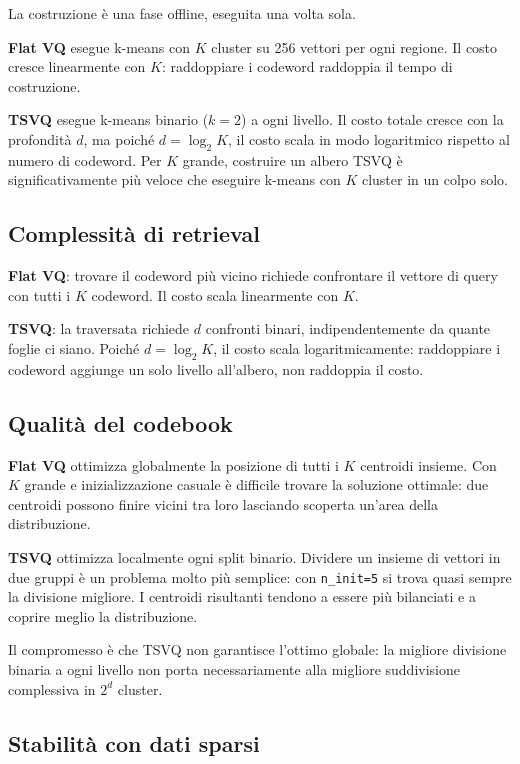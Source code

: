 \documentclass[12pt, a4paper]{article}
\begin{document}
La costruzione è una fase offline, eseguita una volta sola.

\textbf{Flat VQ} esegue k-means con $K$ cluster su 256 vettori per ogni regione. Il costo
cresce linearmente con $K$: raddoppiare i codeword raddoppia il tempo di costruzione.

\textbf{TSVQ} esegue k-means binario ($k=2$) a ogni livello. Il costo totale cresce con la
profondità $d$, ma poiché $d = \log_2 K$, il costo scala in modo logaritmico rispetto al
numero di codeword. Per $K$ grande, costruire un albero TSVQ è significativamente più
veloce che eseguire k-means con $K$ cluster in un colpo solo.

\subsection{Complessità di retrieval}

\textbf{Flat VQ}: trovare il codeword più vicino richiede confrontare il vettore di query
con tutti i $K$ codeword. Il costo scala linearmente con $K$.

\textbf{TSVQ}: la traversata richiede $d$ confronti binari, indipendentemente da quante
foglie ci siano. Poiché $d = \log_2 K$, il costo scala logaritmicamente: raddoppiare i
codeword aggiunge un solo livello all'albero, non raddoppia il costo.

\subsection{Qualità del codebook}

\textbf{Flat VQ} ottimizza globalmente la posizione di tutti i $K$ centroidi insieme. Con
$K$ grande e inizializzazione casuale è difficile trovare la soluzione ottimale: due centroidi
possono finire vicini tra loro lasciando scoperta un'area della distribuzione.

\textbf{TSVQ} ottimizza localmente ogni split binario. Dividere un insieme di vettori in due
gruppi è un problema molto più semplice: con \texttt{n\_init=5} si trova quasi sempre la
divisione migliore. I centroidi risultanti tendono a essere più bilanciati e a coprire meglio
la distribuzione.

Il compromesso è che TSVQ non garantisce l'ottimo globale: la migliore divisione binaria a
ogni livello non porta necessariamente alla migliore suddivisione complessiva in $2^d$ cluster.

\subsection{Stabilità con dati sparsi}
\end{document}
